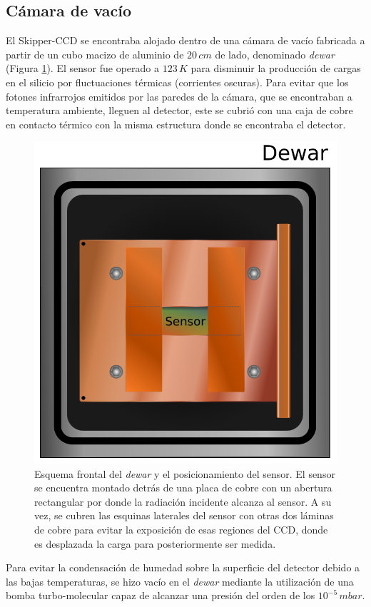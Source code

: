 \subsection{Cámara de vacío}
\noindent El Skipper-CCD se encontraba alojado dentro de una cámara de vacío fabricada a partir de un cubo macizo de aluminio de $20\,\si{cm}$ de lado, denominado \textit{dewar} (Figura \ref{fig:FrontalDewarYSensor}). El sensor fue operado a $123\,\si{K}$ para disminuir la producción de cargas en el silicio por fluctuaciones térmicas (corrientes oscuras). Para evitar que los fotones infrarrojos emitidos por las paredes de la cámara, que se encontraban a temperatura ambiente, lleguen al detector, este se cubrió con una caja de cobre en contacto térmico con la misma estructura donde se encontraba el detector. 
\begin{figure}[h]
    \centering
    \includegraphics[scale=0.5]{Figs/Frontal_Dewar_Sensor.pdf}
    \caption{Esquema frontal del \textit{dewar} y el posicionamiento del sensor. El sensor se encuentra montado detrás de una placa de cobre con un abertura rectangular por donde la radiación incidente alcanza al sensor. A su vez, se cubren las esquinas laterales del sensor con otras dos láminas de cobre para evitar la exposición de esas regiones del CCD, donde es desplazada la carga para posteriormente ser medida.}
    \label{fig:FrontalDewarYSensor}
\end{figure}
Para evitar la condensación de humedad sobre la superficie del detector debido a las bajas temperaturas, se hizo vacío en el \textit{dewar} mediante la utilización de una bomba turbo-molecular capaz de alcanzar una presión del orden de los $10^{-5}\,\si{mbar}$.

